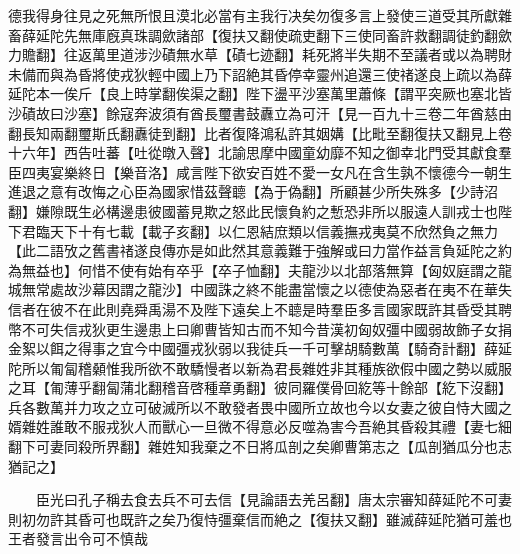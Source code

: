 德我得身往見之死無所恨且漠北必當有主我行决矣勿復多言上發使三道受其所獻雜畜薛延陀先無庫廐真珠調歛諸部【復扶又翻使疏吏翻下三使同畜許救翻調徒釣翻歛力贍翻】往返萬里道涉沙磧無水草【磧七迹翻】耗死將半失期不至議者或以為聘財未備而與為昏將使戎狄輕中國上乃下詔絶其昏停幸靈州追還三使禇遂良上疏以為薛延陀本一俟斤【良上時掌翻俟渠之翻】陛下盪平沙塞萬里蕭條【謂平突厥也塞北皆沙磧故曰沙塞】餘寇奔波須有酋長璽書鼓纛立為可汗【見一百九十三卷二年酋慈由翻長知兩翻璽斯氏翻纛徒到翻】比者復降鴻私許其姻媾【比毗至翻復扶又翻見上卷十六年】西告吐蕃【吐從暾入聲】北諭思摩中國童幼靡不知之御幸北門受其獻食羣臣四夷宴樂終日【樂音洛】咸言陛下欲安百姓不愛一女凡在含生孰不懷德今一朝生進退之意有改悔之心臣為國家惜茲聲聼【為于偽翻】所顧甚少所失殊多【少詩沼翻】嫌隙既生必構邊患彼國蓄見欺之怒此民懷負約之慙恐非所以服遠人訓戎士也陛下君臨天下十有七載【載子亥翻】以仁恩結庶類以信義撫戎夷莫不欣然負之無力【此二語攷之舊書禇遂良傳亦是如此然其意義難于強解或曰力當作益言負延陀之約為無益也】何惜不使有始有卒乎【卒子恤翻】夫龍沙以北部落無算【匈奴庭謂之龍城無常處故沙幕因謂之龍沙】中國誅之終不能盡當懷之以德使為惡者在夷不在華失信者在彼不在此則堯舜禹湯不及陛下遠矣上不聼是時羣臣多言國家既許其昏受其聘幣不可失信戎狄更生邊患上曰卿曹皆知古而不知今昔漢初匈奴彊中國弱故飾子女捐金絮以餌之得事之宜今中國彊戎狄弱以我徒兵一千可擊胡騎數萬【騎奇計翻】薛延陀所以匍匐稽顙惟我所欲不敢驕慢者以新為君長雜姓非其種族欲假中國之勢以威服之耳【匍薄乎翻匐蒲北翻稽音啓種章勇翻】彼同羅僕骨回紇等十餘部【紇下沒翻】兵各數萬并力攻之立可破滅所以不敢發者畏中國所立故也今以女妻之彼自恃大國之婿雜姓誰敢不服戎狄人而獸心一旦微不得意必反噬為害今吾絶其昏殺其禮【妻七細翻下可妻同殺所界翻】雜姓知我棄之不日將瓜剖之矣卿曹第志之【瓜剖猶瓜分也志猶記之】

　　臣光曰孔子稱去食去兵不可去信【見論語去羌呂翻】唐太宗審知薛延陀不可妻則初勿許其昏可也既許之矣乃復恃彊棄信而絶之【復扶又翻】雖滅薛延陀猶可羞也王者發言出令可不慎哉

